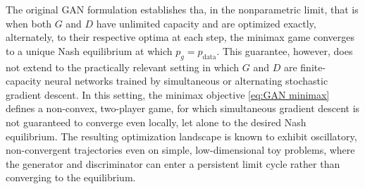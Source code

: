 The original GAN formulation establishes tha, in the nonparametric limit, that is when both $G$ and $D$ have unlimited capacity and are optimized exactly, alternately, to their respective optima at each step,
the minimax game converges to a unique Nash equilibrium at which $p_g = p_{\mathrm{data}}$. This guarantee, however, does not extend to the practically relevant setting in which $G$ and $D$ 
are finite-capacity neural networks trained by simultaneous or alternating stochastic gradient descent. 
In this setting, the minimax objective \ref{eq:GAN minimax}
defines a non-convex, two-player game,
for which simultaneous gradient descent is not guaranteed to converge even locally,
let alone to the desired Nash equilibrium. 
The resulting optimization landscape is known to exhibit oscillatory, non-convergent trajectories even on simple, low-dimensional toy problems,
where the generator and discriminator can enter a persistent limit cycle rather than converging to the equilibrium.\\

